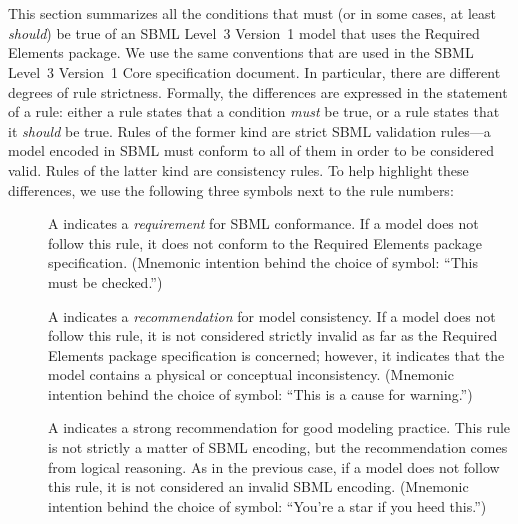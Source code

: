 
\section{\texorpdfstring{}{Validation of SBML documents using Required Elements constructs}}
\label{apdx-validation}
\label{validation-rules}

This section summarizes all the conditions that must (or in some cases, at least \emph{should}) be true of an SBML Level~3 Version~1 model that uses the Required Elements package.  We use the same conventions that are used in the SBML Level~3 Version~1 Core specification document.  In particular, there are different degrees of rule strictness.  Formally, the differences are expressed in the statement of a rule: either a rule states that a condition \emph{must} be true, or a rule states that it \emph{should} be true.  Rules of the former kind are strict SBML validation rules---a model encoded in SBML must conform to all of them in order to be considered valid.  Rules of the latter kind are consistency rules.  To help highlight these differences, we use the following three symbols next to the rule numbers:

\begin{description}

\item[\hspace*{6.5pt}\vSymbol\vsp] A \vSymbolName indicates a \emph{requirement} for SBML conformance. If a model does not follow this rule, it does not conform to the Required Elements package specification.  (Mnemonic intention behind the choice of symbol: ``This must be checked.'')

\item[\hspace*{6.5pt}\cSymbol\csp] A \cSymbolName indicates a \emph{recommendation} for model consistency.  If a model does not follow this rule, it is not considered strictly invalid as far as the Required Elements package specification is concerned; however, it indicates that the model contains a physical or conceptual inconsistency.  (Mnemonic intention behind the choice of symbol: ``This is a cause for warning.'')

\item[\hspace*{6.5pt}\mSymbol\msp] A \mSymbolName indicates a strong recommendation for good modeling practice.  This rule is not strictly a matter of SBML encoding, but the recommendation comes from logical reasoning.  As in the previous case, if a model does not follow this rule, it is not considered an invalid SBML encoding.  (Mnemonic intention behind the choice of symbol: ``You're a star if you heed this.'')

\end{description}

